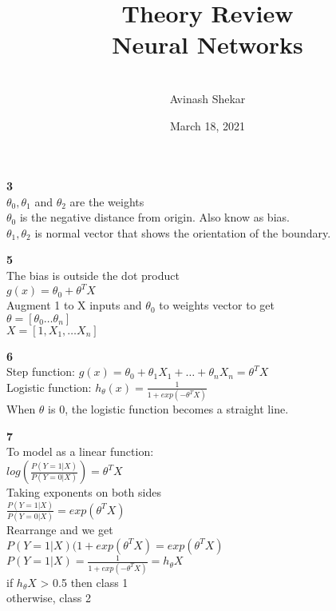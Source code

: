 \documentclass{article}
\begin{document}
\begin{titlepage}
\title{Theory Review \\ Neural Networks
	}
\author{\\
 Avinash Shekar}
\date{March 18, 2021}
\maketitle
\end{titlepage}



\textbf{3}\bigskip \\
$\theta_0,\theta_1$ and $\theta_2$ are the weights \smallskip \\
$\theta_0$ is the negative distance from origin. Also know as bias. \smallskip \\
$\theta_1,\theta_2$ is normal vector that shows the orientation of the boundary.

\textbf{5}\bigskip \\
The bias is outside the dot product \smallskip \\
$g(x) = \theta_0 + \theta^{T}X$ \smallskip \\
Augment 1 to X inputs and $\theta_0$ to weights vector to get \smallskip \\
$\theta = [\theta_0 \dots \theta_n]$ \smallskip \\
$X = [1,X_1, \dots X_n]$

\textbf{6}\bigskip \\
Step function: $g(x) = \theta_0 + \theta_1 X_1 + \dots + \theta_n X_n = \theta^{T}X$\smallskip \\
Logistic function: $h_{\theta}(x) = \frac{1}{1+exp(-\theta^{T}X)}$\bigskip \\
When $\theta$ is 0, the logistic function becomes a straight line.

\textbf{7}\bigskip \\
To model as a linear function:\smallskip \\
$log(\frac{P(Y=1|X)}{P(Y=0|X)}) = \theta^{T}X$\smallskip \\
Taking exponents on both sides \smallskip \\
$\frac{P(Y=1|X)}{P(Y=0|X)} = exp(\theta^{T}X)$ \smallskip \\
Rearrange and we get \smallskip \\
$P(Y=1|X)(1+exp(\theta^{T}X)=exp(\theta^{T}X)$ \smallskip \\
$P(Y=1|X) = \frac{1}{1+exp(-\theta^{T}X)} = h_{\theta}X$ \smallskip \\
if $h_{\theta}X$ > 0.5 then class 1 \smallskip \\
otherwise, class 2
\end{document}
